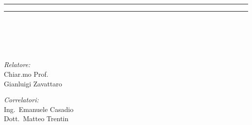 \documentclass[../thesis.tex]{subfiles}
\begin{document}
    \begin{titlepage}
        \begin{center}
            \begin{Large}
                \textbf{\myUni}\\
            \end{Large}

            \rule[0.1cm]{13.9cm}{0.1mm}
            \rule[0.5cm]{13.9cm}{0.6mm}
            
            \vspace{10pt}

            \begin{large}
                \textsc{\myDepartment}\\
                \textsc{\myFaculty}\\
            \end{large}

            \vspace{10pt}
            
            \begin{LARGE}
                \begin{center}
                    \textbf{\myTitle}\\
                \end{center}
            \end{LARGE}

            \vspace{100pt}

            \begin{large}
                \begin{flushleft}
                    \textit{Relatore:}\\
                    \vspace{1pt}
                    Chiar.mo Prof.\\ Gianluigi Zavattaro
                \end{flushleft}
                \begin{flushleft}
                    \textit{Correlatori:}\\
                    \vspace{1pt}
                    Ing.\ Emanuele Casadio\\
                    \vspace{1pt}
                    Dott.\ Matteo Trentin
                \end{flushleft}
            

\end{large}
\end{center}
\end{titlepage}
\end{document}
